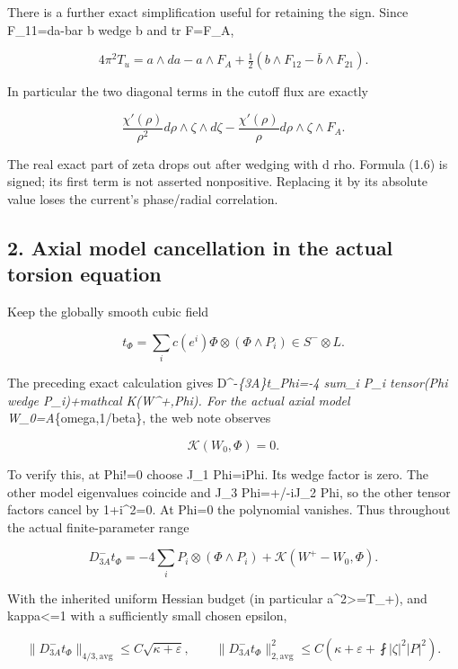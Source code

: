 \documentclass[
  10pt,
]{article}
\begin{document}
There is a further exact simplification useful for retaining the sign.
Since F\_11=da-bar b wedge b and tr F=F\_A,

\[
 \boxed{4\pi^2T_u=a\wedge da-a\wedge F_A
 +\tfrac12(b\wedge F_{12}-\bar b\wedge F_{21}).}       \tag{1.5}
\]

In particular the two diagonal terms in the cutoff flux are exactly

\[
 \frac{\chi'(\rho)}{\rho^2}d\rho\wedge\zeta\wedge d\zeta
 -\frac{\chi'(\rho)}\rho d\rho\wedge\zeta\wedge F_A.  \tag{1.6}
\]

The real exact part of zeta drops out after wedging with d rho. Formula
(1.6) is signed; its first term is not asserted nonpositive. Replacing
it by its absolute value loses the current's phase/radial correlation.

\hypertarget{axial-model-cancellation-in-the-actual-torsion-equation}{%
\subsection{2. Axial model cancellation in the actual torsion
equation}\label{axial-model-cancellation-in-the-actual-torsion-equation}}

Keep the globally smooth cubic field

\[
 t_\Phi=\sum_i c(e^i)\Phi\otimes(\Phi\wedge P_i)\in S^-\otimes L.
\]

The preceding exact calculation gives D\^{}-\emph{\{3A\}t\_Phi=-4 sum\_i
P\_i tensor(Phi wedge P\_i)+mathcal K(W\^{}+,Phi). For the actual axial
model W\_0=A}\{omega,1/beta\}, the web note observes

\[
 \mathcal K(W_0,\Phi)=0.                              \tag{2.1}
\]

To verify this, at Phi!=0 choose J\_1 Phi=iPhi. Its wedge factor is
zero. The other model eigenvalues coincide and J\_3 Phi=+/-iJ\_2 Phi, so
the other tensor factors cancel by 1+i\^{}2=0. At Phi=0 the polynomial
vanishes. Thus throughout the actual finite-parameter range

\[
 D^-_{3A}t_\Phi=-4\sum_i P_i\otimes(\Phi\wedge P_i)
       +\mathcal K(W^+-W_0,\Phi).                     \tag{2.2}
\]

With the inherited uniform Hessian budget (in particular
a\^{}2\textgreater=T\_+), and kappa\textless=1 with a sufficiently small
chosen epsilon,

\[
 \|D^-_{3A}t_\Phi\|_{4/3,\mathrm{avg}}
       \le C\sqrt{\kappa+\varepsilon},\qquad
 \|D^-_{3A}t_\Phi\|_{2,\mathrm{avg}}^2
       \le C\left(\kappa+\varepsilon+\fint|\zeta|^2|P|^2\right).
                                                               \tag{2.3}
\]
\end{document}
